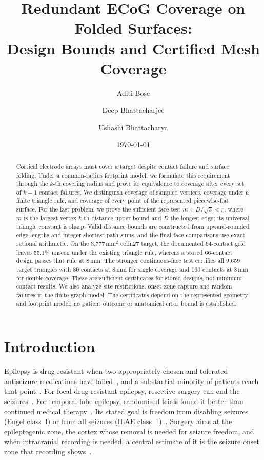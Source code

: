 \documentclass[11pt]{amsart}
\title[Certified redundant ECoG coverage]{Redundant ECoG Coverage on Folded Surfaces:\\Design Bounds and Certified Mesh Coverage}
\author{Aditi Bose}
\author[D. Bhattacharjee]{Deep Bhattacharjee}
\author[U. Bhattacharya]{Ushashi Bhattacharya}
\date{\today}
\theoremstyle{definition}
\theoremstyle{remark}
\begin{document}
\begin{abstract}
Cortical electrode arrays must cover a target despite contact failure and
surface folding. Under a common-radius footprint model, we formulate this
requirement through the $k$-th covering radius and prove its equivalence to
coverage after every set of $k-1$ contact failures. We distinguish coverage
of sampled vertices, coverage under a finite triangle rule, and coverage of
every point of the represented piecewise-flat surface. For the last problem,
we prove the sufficient face test $m+D/\sqrt3<r$, where $m$ is the largest
vertex $k$-th-distance upper bound and $D$ the longest edge; its universal
triangle constant is sharp. Valid distance bounds are constructed from
upward-rounded edge lengths and integer shortest-path sums, and the final
face comparisons use exact rational arithmetic. On the 3,777\,mm$^2$
colin27 target, the documented 64-contact grid leaves 55.1\% unseen under
the existing triangle rule, whereas a stored 66-contact design passes that
rule at $8$\,mm. The stronger continuous-face test certifies all 9,659 target
triangles with 80 contacts at $8$\,mm for single coverage and 160 contacts
at $8$\,mm for double coverage. These are sufficient certificates for stored
designs, not minimum-contact results. We also analyze site restrictions,
onset-zone capture and random failures in the finite graph model. The
certificates depend on the represented geometry and footprint model; no
patient outcome or anatomical error bound is established.
\end{abstract}

\maketitle

\section{Introduction}\label{sec:intro}

Epilepsy is drug-resistant when two appropriately chosen and tolerated
antiseizure medications have failed~\cite{Kwan2010}, and a substantial
minority of patients reach that point~\cite{KwanBrodie2000}. For focal
drug-resistant epilepsy, resective surgery can end the
seizures~\cite{JobstCascino2015}. For temporal lobe epilepsy, randomised trials found it better than
continued medical therapy~\cite{Wiebe2001,Engel2012}. Its stated goal is
freedom from disabling seizures (Engel class~I) or from all seizures (ILAE
class~1)~\cite{Engel1993,Wieser2001,JobstCascino2015}. Surgery aims at the
epileptogenic zone, the cortex whose removal is needed for seizure freedom,
and when intracranial recording is needed, a central estimate of it is the
seizure onset zone that recording shows~\cite{RosenowLuders2001}.
\end{document}
